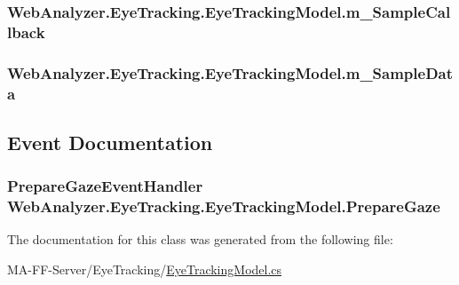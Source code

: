 \subsubsection[{m\+\_\+\+Sample\+Callback}]{ Web\+Analyzer.\+Eye\+Tracking.\+Eye\+Tracking\+Model.\+m\+\_\+\+Sample\+Callback\hspace{0.3cm}{\ttfamily [private]}}\label{class_web_analyzer_1_1_eye_tracking_1_1_eye_tracking_model_a968cb8269069b117054c23c913671380}
\hypertarget{class_web_analyzer_1_1_eye_tracking_1_1_eye_tracking_model_ad25c95ebc65d459b55fe943260c8c826}{}
\subsubsection[{m\+\_\+\+Sample\+Data}]{ Web\+Analyzer.\+Eye\+Tracking.\+Eye\+Tracking\+Model.\+m\+\_\+\+Sample\+Data}\label{class_web_analyzer_1_1_eye_tracking_1_1_eye_tracking_model_ad25c95ebc65d459b55fe943260c8c826}


\subsection{Event Documentation}
\hypertarget{class_web_analyzer_1_1_eye_tracking_1_1_eye_tracking_model_a170dd57ad1784737ddf34dc14f82293d}{}
\subsubsection[{Prepare\+Gaze}]{\setlength{\rightskip}{0pt plus 5cm}Prepare\+Gaze\+Event\+Handler Web\+Analyzer.\+Eye\+Tracking.\+Eye\+Tracking\+Model.\+Prepare\+Gaze}\label{class_web_analyzer_1_1_eye_tracking_1_1_eye_tracking_model_a170dd57ad1784737ddf34dc14f82293d}


The documentation for this class was generated from the following file\+:\begin{DoxyCompactItemize}
\item 
M\+A-\/\+F\+F-\/\+Server/\+Eye\+Tracking/\hyperlink{_eye_tracking_model_8cs}{Eye\+Tracking\+Model.\+cs}\end{DoxyCompactItemize}
